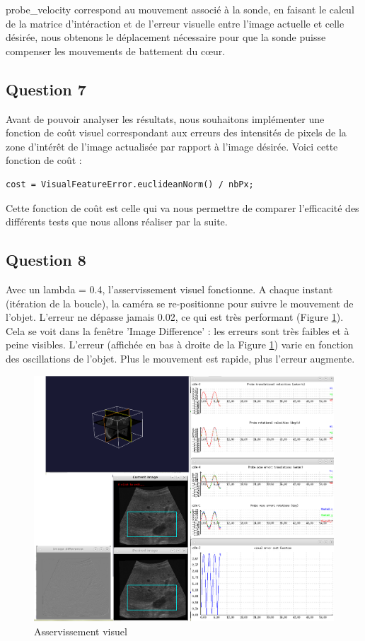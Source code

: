 \documentclass[a4paper,11pt]{article}
\begin{document}
probe\_velocity correspond au mouvement associ\'e \`a la sonde, en faisant le calcul de la matrice d'int\'eraction et de l'erreur visuelle entre l'image actuelle et celle d\'esir\'ee, nous obtenons le d\'eplacement n\'ecessaire pour que la sonde puisse compenser les mouvements de battement du c\oe ur.

\subsection{Question 7}
Avant de pouvoir analyser les r\'esultats, nous souhaitons impl\'ementer une fonction de co\^ut visuel correspondant aux erreurs des intensit\'es de pixels de la zone d'int\'er\^et de l'image actualis\'ee par rapport \`a l'image d\'esir\'ee. Voici cette fonction de co\^ut : 
\begin{verbatim}
cost = VisualFeatureError.euclideanNorm() / nbPx;
\end{verbatim}

Cette fonction de co\^ut est celle qui va nous permettre de comparer l'efficacit\'e des diff\'erents tests que nous allons r\'ealiser par la suite. 

\subsection{Question 8}
Avec un lambda = 0.4, l'asservissement visuel fonctionne. A chaque instant (it\'eration de la boucle), la cam\'era se re-positionne pour suivre le mouvement de l'objet. L'erreur ne d\'epasse jamais 0.02, ce qui est tr\`es performant (Figure \ref{assertVisu}). Cela se voit dans la fen\^etre 'Image Difference' : les erreurs sont tr\`es faibles et \`a peine visibles. L'erreur (affich\'ee en bas \`a droite de la Figure \ref{assertVisu}) varie en fonction des oscillations de l'objet. Plus le mouvement est rapide, plus l'erreur augmente.
\begin{figure}[H]
    \centering
    \includegraphics[width=1.0\textwidth]{./images/q8.png}
    \caption{Asservissement visuel}
    \label{assertVisu}
\end{figure}
\end{document}
